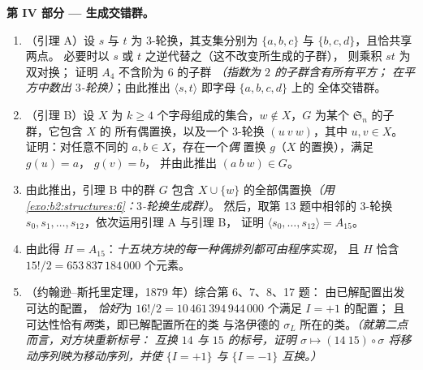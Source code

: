 \begin{problem}
\medskip
\noindent\textbf{第 IV 部分 --- 生成交错群。}
\begin{enumerate}[resume]
  \item （引理 A）设 $s$ 与 $t$ 为 $3$-轮换，其支集分别为 $\{a, b, c\}$
        与 $\{b, c, d\}$，且恰共享两点。
        必要时以 $s$ 或 $t$ 之逆代替之（这不改变所生成的子群），
        则乘积 $st$ 为双对换；
        证明 $A_4$ 不含阶为 $6$ 的子群
        \emph{（指数为 $2$ 的子群含有所有平方；
        在平方中数出 $3$-轮换）}；由此推出
        $\langle s, t\rangle$
        即字母 $\{a, b, c, d\}$ 上的
        全体交错群。
  \item （引理 B）设 $X$ 为 $k \geq 4$ 个字母组成的集合，$w
        \notin X$，$G$ 为某个 $\mathfrak{S}_n$ 的子群，它包含 $X$ 的
        所有偶置换，以及一个 $3$-轮换 $(u\ v\ w)$，其中 $u, v \in X$。
        证明：对任意不同的 $a, b \in X$，存在一个\emph{偶}
        置换 $g$（$X$ 的置换），满足 $g(u) = a$，
        $g(v) = b$，
        并由此推出 $(a\ b\ w) \in G$。
  \item 由此推出，引理 B 中的群 $G$ 包含
        $X \cup \{w\}$ 的全部偶置换\emph{（用
        \cref{exo:b2:structures:6}：$3$-轮换生成群）}。
        然后，取第 13 题中相邻的
        $3$-轮换 $s_0, s_1, \dots, s_{12}$，依次运用引理 A 与引理 B，
        证明 $\langle s_0, \dots, s_{12}\rangle = A_{15}$。
  \item 由此得 $H = A_{15}$：\emph{十五块方块的每一种偶排列都可由程序实现}，
        且 $H$ 恰含
        $15!/2 = 653\,837\,184\,000$ 个元素。
  \item （约翰逊–斯托里定理，1879 年）综合第 6、7、8、17 题：
        由已解配置出发可达的配置，
        \emph{恰好}为 $16!/2 =
        10\,461\,394\,944\,000$ 个满足 $I = +1$ 的配置；
        且可达性恰有\emph{两}类，即已解配置所在的类
        与洛伊德的
        $\sigma_L$ 所在的类。\emph{（就第二点而言，对方块重新标号：
        互换 $14$ 与 $15$ 的标号，证明 $\sigma \mapsto (14\ 15) \circ
        \sigma$ 将移动序列映为移动序列，并使
        $\{I = +1\}$ 与 $\{I = -1\}$ 互换。）}
\end{enumerate}


\end{problem}
